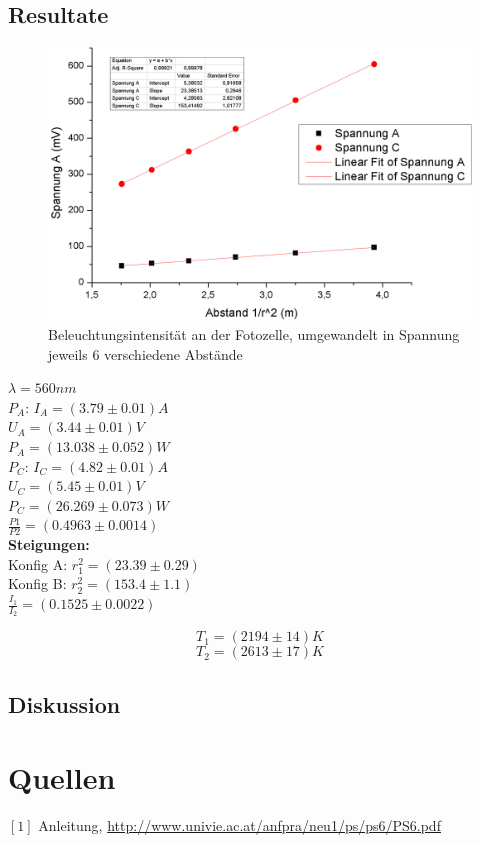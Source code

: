 \documentclass[12pt,a4paper]{article}
\begin{document}
\subsection{Resultate}


\begin{figure}[H]
	\centering
	\includegraphics[scale=0.6
	]{data/waermestrahlung.png}
	\caption{Beleuchtungsintensität an der Fotozelle, umgewandelt in Spannung\\
	jeweils 6 verschiedene Abstände}
	\label{fig:waermestrahlung_messung}
\end{figure}
\begin{multicols}{2}

\noindent $\lambda = 560 nm$\\
$P_A$: $I_A=(3.79\pm 0.01)A$\\
\indent $U_A=(3.44\pm 0.01)V$\\
$P_A=(13.038 \pm 0.052)W$\\

\noindent $P_C$: $I_C=(4.82\pm0.01)A$\\
\indent $U_C=(5.45 \pm 0.01)V$\\
$P_C=(26.269 \pm 0.073)W$\\

\noindent $\frac{P1}{P2}=(0.4963 \pm 0.0014)$\\

\noindent \textbf{Steigungen:}\\
Konfig A: $r_1^2=(23.39 \pm 0.29)$\\
Konfig B: $r_2^2=(153.4 \pm 1.1)$\\

$\frac{I_1}{I_2}= ( 0.1525 \pm 0.0022)$

$$T_1= (2194\pm 14)K$$
$$T_2=(2613 \pm 17)K$$

\subsection{Diskussion}




\section{Quellen}
$[1]$ Anleitung, \url{http://www.univie.ac.at/anfpra/neu1/ps/ps6/PS6.pdf}\\

\end{multicols}
\end{document}
